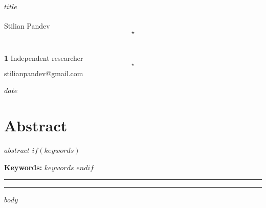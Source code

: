 \documentclass[submission, Phys]{SciPost}
\begin{document}
\begin{center}{\Large \textbf{$title$}}\end{center}

\begin{center}
Stilian Pandev\textsuperscript{$$\star$$}\,
\end{center}

\begin{center}
{\bf 1} Independent researcher
\\[2pt]
$${}^\star$$ {\small \sf stilianpandev@gmail.com}
\end{center}

\begin{center}
$date$
\end{center}

\section*{Abstract}
{\bf
$abstract$
}
$if(keywords)$

\vspace{6pt}
\noindent\textbf{Keywords:} $keywords$
$endif$

\vspace{10pt}
\noindent\rule{\textwidth}{1pt}
\tableofcontents\thispagestyle{fancy}
\noindent\rule{\textwidth}{1pt}
\vspace{10pt}

$body$



\end{document}
